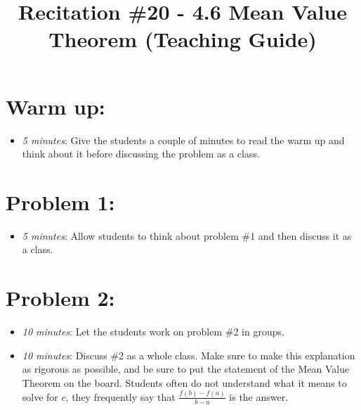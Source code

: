 \documentclass[handout,nooutcomes]{ximera}
\title{Recitation \#20 - 4.6 Mean Value Theorem (Teaching Guide)}
\begin{document}
\begin{abstract}		\end{abstract}
\maketitle


\section*{Warm up:} 
	
	\begin{itemize}
	
	\item  \emph{5 minutes}:  Give the students a couple of minutes to read the warm up and think about it before discussing the problem as a class.
	
	
	
	\end{itemize}


\section*{Problem 1:}

	\begin{itemize}
	
	\item  \emph{5 minutes}:  Allow students to think about problem \#1 and then discuss it as a class.
	
	\end{itemize}



\section*{Problem 2:}

	\begin{itemize}
	
	\item  \emph{10 minutes}:  Let the students work on problem \#2 in groups.
		
	\item  \emph{10 minutes}:  Discuss \#2 as a whole class.  Make sure to make this explanation as rigorous as possible, and be sure to put the statement of the Mean Value Theorem on the board.  Students often do not understand what it means to solve for $c$, they frequently say that $\frac{f(b) - f(a)}{b-a}$ is the answer.
			
	\end{itemize}
	
\end{document}
